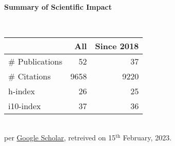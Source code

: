\headedsection %
{\bf Summary of Scientific Impact}{}{}
{
    \qquad~~~~
    \begin{minipage}[t]{0.6\textwidth}
        \begin{tabular}{lrr}
        \hline
         & All & Since 2018\\
        \hline
        \# Publications & 52    & 37    \\
        \# Citations    & 9658  & 9220  \\
        h-index         & 26    & 25    \\
        i10-index       & 37    & 36    \\
        \hline
    \end{tabular}
    \\
    {\footnotesize{
        per \href{https://scholar.google.com/citations?user=wpLQuroAAAAJ}{Google Scholar},
        retreived on 15$^\text{th}$ February, 2023.
        }
    }
    \end{minipage}
     
}